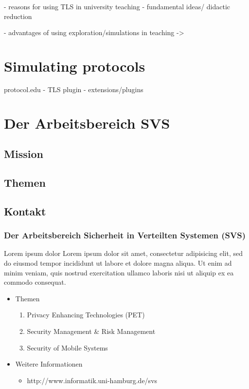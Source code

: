 - reasons for using TLS in university teaching
- fundamental ideas/ didactic reduction

- advantages of using exploration/simulations in teaching ->

\section{Simulating protocols}

protocol.edu
	- TLS plugin
	- extensions/plugins




\section{Der Arbeitsbereich SVS} %
\subsection{Mission} %
\subsection{Themen} %
\subsection{Kontakt} %

\begin{frame}
	\frametitle{Der Arbeitsbereich Sicherheit in Verteilten Systemen (SVS)}
	\begin{block}{Lorem ipsum dolor}
		Lorem ipsum dolor sit amet, consectetur adipisicing elit, sed do eiusmod tempor incididunt ut labore et dolore magna aliqua. Ut enim ad minim veniam, quis nostrud exercitation ullamco laboris nisi ut aliquip ex ea commodo consequat. 
	\end{block}
	\begin{itemize}
		\item Themen
			\begin{enumerate}
				\item Privacy Enhancing Technologies (PET)
				\item Security Management \& Risk Management
				\item Security of Mobile Systems
			\end{enumerate}
		\item Weitere Informationen
			\begin{itemize}
				\item http://www.informatik.uni-hamburg.de/svs
			\end{itemize}
	\end{itemize}
\end{frame}

